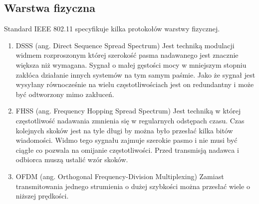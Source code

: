 \documentclass{article}
\begin{document}
        \subsection{Warstwa fizyczna}
            Standard IEEE 802.11 specyfikuje kilka protokołów warstwy fizycznej.
            \begin{enumerate}
                \item DSSS (ang. Direct Sequence Spread Spectrum) Jest techniką modulacji
                    widmem rozproszonym której szerokość pasma nadawanego jest znacznie
                    większa niż wymagana. Sygnał o małej gęstości mocy w mniejszym stopniu 
                    zakłóca działanie innych systemów na tym samym paśmie. Jako że sygnał 
                    jest wysyłany równocześnie na wielu częstotliwościach jest on 
                    redundantny i może być odtworzony mimo zakłuceń.
                \item FHSS (ang. Frequency Hopping Spread Spectrum) Jest techniką w której
                    częstotliwość nadawania zmnienia się w regularnych odstępach czasu.
                    Czas kolejnych skoków jest na tyle długi by można było przesłać kilka
                    bitów wiadomości. Widmo tego sygnału zajmuje szerokie pasmo i nie musi
                    być ciągłe co pozwala na omijanie częstotliwości. Przed transmisją 
                    nadawca i odbiorca muszą ustalić wzór skoków. 
                \item OFDM (ang. Orthogonal Frequency-Division Multiplexing) Zamiast 
                    transmitowania jednego strumienia o dużej szybkości można przesłać
                    wiele o niższej prędkości.
            \end{enumerate}
\end{document}
